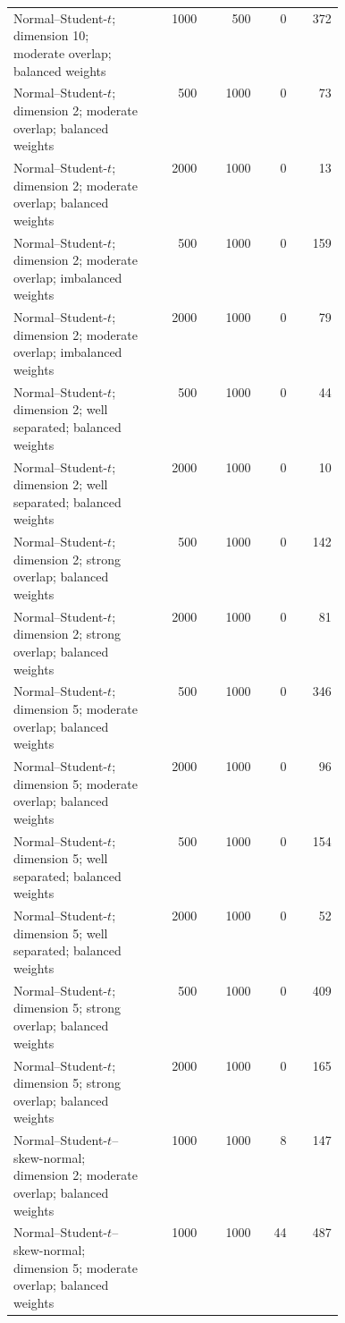 \begin{longtable}{p{0.43\linewidth}rrrr}
Normal--Student-$t$; dimension 10; moderate overlap; balanced weights & 1000 & 500 & 0 & 372 \\
Normal--Student-$t$; dimension 2; moderate overlap; balanced weights & 500 & 1000 & 0 & 73 \\
Normal--Student-$t$; dimension 2; moderate overlap; balanced weights & 2000 & 1000 & 0 & 13 \\
Normal--Student-$t$; dimension 2; moderate overlap; imbalanced weights & 500 & 1000 & 0 & 159 \\
Normal--Student-$t$; dimension 2; moderate overlap; imbalanced weights & 2000 & 1000 & 0 & 79 \\
Normal--Student-$t$; dimension 2; well separated; balanced weights & 500 & 1000 & 0 & 44 \\
Normal--Student-$t$; dimension 2; well separated; balanced weights & 2000 & 1000 & 0 & 10 \\
Normal--Student-$t$; dimension 2; strong overlap; balanced weights & 500 & 1000 & 0 & 142 \\
Normal--Student-$t$; dimension 2; strong overlap; balanced weights & 2000 & 1000 & 0 & 81 \\
Normal--Student-$t$; dimension 5; moderate overlap; balanced weights & 500 & 1000 & 0 & 346 \\
Normal--Student-$t$; dimension 5; moderate overlap; balanced weights & 2000 & 1000 & 0 & 96 \\
Normal--Student-$t$; dimension 5; well separated; balanced weights & 500 & 1000 & 0 & 154 \\
Normal--Student-$t$; dimension 5; well separated; balanced weights & 2000 & 1000 & 0 & 52 \\
Normal--Student-$t$; dimension 5; strong overlap; balanced weights & 500 & 1000 & 0 & 409 \\
Normal--Student-$t$; dimension 5; strong overlap; balanced weights & 2000 & 1000 & 0 & 165 \\
Normal--Student-$t$--skew-normal; dimension 2; moderate overlap; balanced weights & 1000 & 1000 & 8 & 147 \\
Normal--Student-$t$--skew-normal; dimension 5; moderate overlap; balanced weights & 1000 & 1000 & 44 & 487 \\
\bottomrule
\end{longtable}
\endgroup

